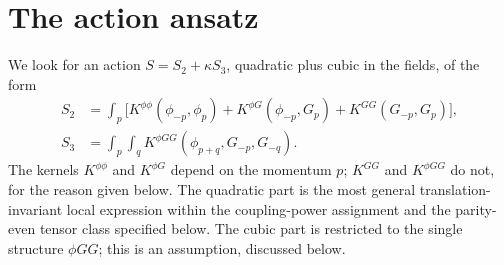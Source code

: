\documentclass[prd,aps,preprint,superscriptaddress,nofootinbib,amsmath,amssymb,eqsecnum]{revtex4-2}
\newcommand{\ip}[1]{\int_{#1}}
\begin{document}
\section{The action ansatz}
\label{sec:ansatz}

We look for an action $S=S_2+\kappa S_3$, quadratic plus cubic in the fields, of the form
\begin{equation}
\begin{aligned}
S_2&=\ip{p}\Big[K^{\phi\phi}(\phi_{-p},\phi_p)+K^{\phi G}(\phi_{-p},G_p)+K^{GG}(G_{-p},G_p)\Big],\\
S_3&=\ip{p}\ip{q}K^{\phi GG}(\phi_{p+q},G_{-p},G_{-q}).
\end{aligned}
\label{eq:ansatz}
\end{equation}
The kernels $K^{\phi\phi}$ and $K^{\phi G}$ depend on the momentum $p$; $K^{GG}$ and
$K^{\phi GG}$ do not, for the reason given below.
The quadratic part is the most general translation-invariant local expression within the
coupling-power assignment and the parity-even tensor class specified below. The cubic part
is restricted to the single structure $\phi GG$; this is an assumption, discussed below.
\end{document}
